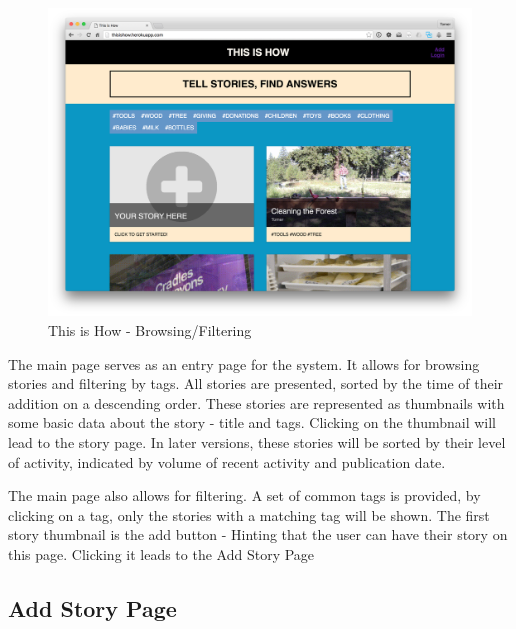    \begin{figure}[thpb]
      \centering
      \includegraphics[width=\textwidth]{figures/mainpage.png}
      \caption{This is How - Browsing/Filtering}
      \label{fig_main_page}
   \end{figure}

The main page serves as an entry page for the system. It allows for browsing stories and filtering by tags. All stories are presented, sorted by the time of their addition on a descending order. These stories are represented as thumbnails with some basic data about the story - title and tags. Clicking on the thumbnail will lead to the story page. In later versions, these stories will be sorted by their level of activity, indicated by volume of recent activity and publication date. 

The main page also allows for filtering. A set of common tags is provided, by clicking on a tag, only the stories with a matching tag will be shown. The first story thumbnail is the add button - Hinting that the user can have their story on this page. Clicking it leads to the Add Story Page

\subsection{Add Story Page}

